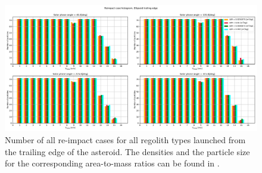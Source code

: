 \begin{figure}[htb]
\centering
\captionsetup{justification=centering}
\includegraphics[angle=90, width=\textwidth, height=\textheight, keepaspectratio=true]{trailing_edge_perturbations/allReimpactCases.pdf}
\caption{Number of all re-impact cases for all regolith types launched from the trailing edge of the asteroid. The densities and the particle size for the corresponding area-to-mass ratios can be found in .}
\label{fig:trailingEdge_allParticles_reimpact_hist}
\end{figure}
\FloatBarrier
